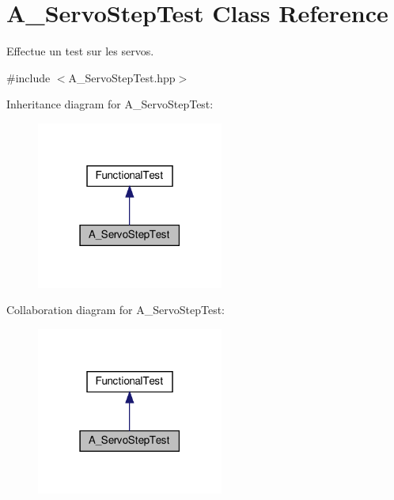 \hypertarget{classA__ServoStepTest}{}\section{A\+\_\+\+Servo\+Step\+Test Class Reference}
\label{classA__ServoStepTest}


Effectue un test sur les servos.  




{\ttfamily \#include $<$A\+\_\+\+Servo\+Step\+Test.\+hpp$>$}



Inheritance diagram for A\+\_\+\+Servo\+Step\+Test\+:
\nopagebreak
\begin{figure}[H]
\begin{center}
\leavevmode
\includegraphics[width=174pt]{classA__ServoStepTest__inherit__graph}
\end{center}
\end{figure}


Collaboration diagram for A\+\_\+\+Servo\+Step\+Test\+:
\nopagebreak
\begin{figure}[H]
\begin{center}
\leavevmode
\includegraphics[width=174pt]{classA__ServoStepTest__coll__graph}
\end{center}
\end{figure}

